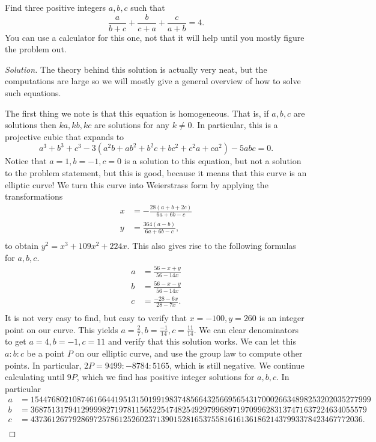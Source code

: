 \begin{prb}
Find three positive integers $a, b, c$ such that
\[ \frac{a}{b + c} + \frac{b}{c + a} + \frac{c}{a + b} = 4. \]
You can use a calculator for this one, not that it will help until you mostly
figure the problem out.
\end{prb}

\ifsolutions
\begin{proof}[Solution]
The theory behind this solution is actually very neat, but the computations are
large so we will mostly give a general overview of how to solve such equations.

The first thing we note is that this equation is homogeneous. That is, if $a, b,
c$ are solutions then $ka, kb, kc$ are solutions for any $k \neq 0$. In
particular, this is a projective cubic that expands to
\[ a^3 + b^3 + c^3 - 3(a^2 b + a b^2 + b^2 c + b c^2 + c^2 a + ca^2) - 5abc = 0.
\]
Notice that $a = 1, b = -1, c = 0$ is a solution to this equation, but not a
solution to the problem statement, but this is good, because it means that this
curve is an elliptic curve! We turn this curve into Weierstrass form by applying
the transformations
\[ \begin{aligned}
x &= -\frac{28 (a + b + 2c)}{6a + 6b - c} \\
y &= \frac{364 (a - b)}{6a + 6b - c}, \\
\end{aligned} \]
to obtain $y^2 = x^3 + 109 x^2 + 224x$. This also gives rise to the following
formulas for $a, b, c$.
\[ \begin{aligned}
a &= \frac{56 - x + y}{56 - 14x} \\
b &= \frac{56 - x - y}{56 - 14x} \\
c &= \frac{-28 - 6x}{28 - 7x}. \\
\end{aligned} \]
It is not very easy to find, but easy to verify that $x = -100, y = 260$
is an integer point on our curve. This yields $a = \frac{2}{7}, b =
\frac{-1}{14}, c = \frac{11}{14}$. We can clear denominators to get $a = 4, b =
-1, c = 11$ and verify that this solution works. We can let this $a : b : c$ be
a point $P$ on our elliptic curve, and use the group law to compute other
points. In particular, $2P = 9499 : -8784 : 5165$, which is still negative. We
continue calculating until $9P$, which we find has positive integer solutions
for $a, b, c$. In particular
\[ \begin{aligned}
a &=
154476802108746166441951315019919837485664325669565431700026634898253202035277999
\\
b &=
36875131794129999827197811565225474825492979968971970996283137471637224634055579
\\
c &=
4373612677928697257861252602371390152816537558161613618621437993378423467772036.
\\
\end{aligned} \]
\end{proof}
\fi
